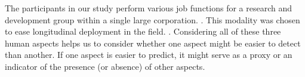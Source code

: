 
The participants in
our study perform various job functions for a research and
development group within a single large corporation. . This modality was chosen to
ease longitudinal deployment in the field. . Considering all of these three human aspects helps us to 
consider whether one aspect might be easier to detect than another. If one aspect is easier to predict, it 
might serve as a proxy or an indicator of the presence (or absence) of other aspects.

